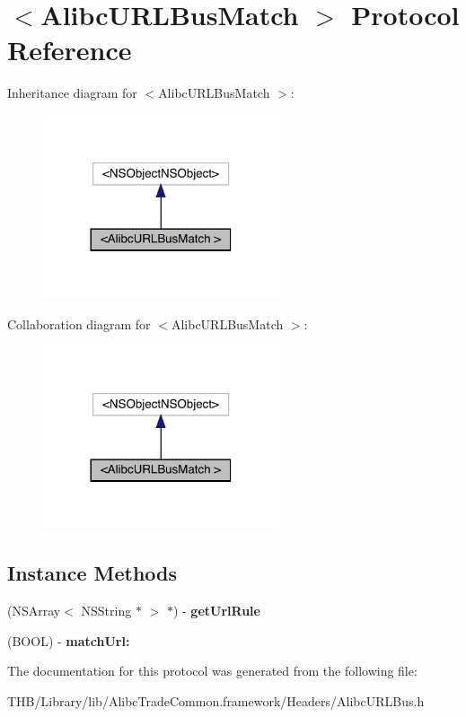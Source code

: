 \hypertarget{protocol_alibc_u_r_l_bus_match_01-p}{}\section{$<$Alibc\+U\+R\+L\+Bus\+Match $>$ Protocol Reference}
\label{protocol_alibc_u_r_l_bus_match_01-p}


Inheritance diagram for $<$Alibc\+U\+R\+L\+Bus\+Match $>$\+:\nopagebreak
\begin{figure}[H]
\begin{center}
\leavevmode
\includegraphics[width=197pt]{protocol_alibc_u_r_l_bus_match_01-p__inherit__graph}
\end{center}
\end{figure}


Collaboration diagram for $<$Alibc\+U\+R\+L\+Bus\+Match $>$\+:\nopagebreak
\begin{figure}[H]
\begin{center}
\leavevmode
\includegraphics[width=197pt]{protocol_alibc_u_r_l_bus_match_01-p__coll__graph}
\end{center}
\end{figure}
\subsection*{Instance Methods}
\begin{DoxyCompactItemize}
\item 
\mbox{\label{protocol_alibc_u_r_l_bus_match_01-p_a25df757090ed385a6a77f15de6d1330d}} 
(N\+S\+Array$<$ N\+S\+String $\ast$ $>$ $\ast$) -\/ {\bfseries get\+Url\+Rule}
\item 
\mbox{\label{protocol_alibc_u_r_l_bus_match_01-p_a72e1c829cb76f298809ac02c0d6710e0}} 
(B\+O\+OL) -\/ {\bfseries match\+Url\+:}
\end{DoxyCompactItemize}


The documentation for this protocol was generated from the following file\+:\begin{DoxyCompactItemize}
\item 
T\+H\+B/\+Library/lib/\+Alibc\+Trade\+Common.\+framework/\+Headers/Alibc\+U\+R\+L\+Bus.\+h\end{DoxyCompactItemize}
